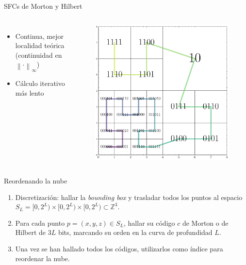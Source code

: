 \documentclass[aspectratio=169]{beamer}
\begin{document}
\begin{frame}{SFCs de Morton y Hilbert}
\begin{columns}
            \begin{itemize}
                \item Continua, mejor localidad teórica (continuidad en ${\left\lVert \cdot \right\rVert}_\infty$)
                \item Cálculo iterativo más lento
            \end{itemize}            
            \begin{figure}
                \includegraphics[scale=0.27]{img/hilbert_quadtree.pdf}
            \end{figure}
        \end{columns}
\end{frame}

\begin{frame}{Reordenando la nube}
    \begin{enumerate}
        \item Discretización: hallar la \textit{bounding box} y trasladar todos los puntos al espacio $S_L = [0,2^L) \times [0, 2^L) \times [0, 2^L) \subset \mathbb{Z}^3$.
        \item Para cada punto $p =(x,y,z) \in S_L$, hallar su código $c$ de Morton o de Hilbert de $3L$ bits, marcando su orden en la curva de profundidad $L$.
        \item Una vez se han hallado todos los códigos, utilizarlos como índice para reordenar la nube.
    \end{enumerate}

\end{frame}
\end{document}
